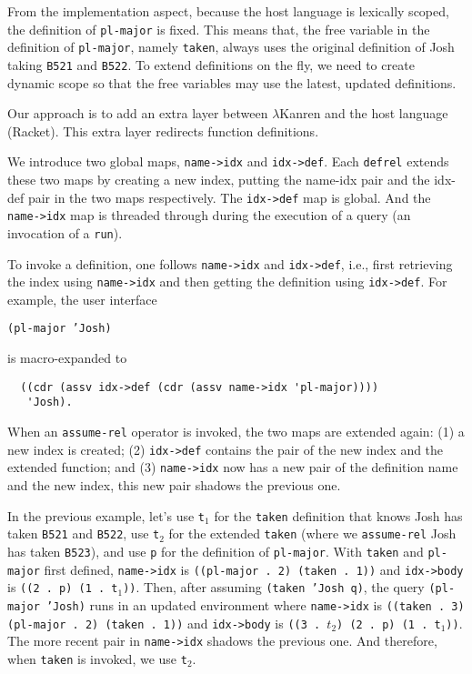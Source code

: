 \documentclass[acmlarge,review]{acmart}
\theoremstyle{definition}
\begin{document}
From the implementation aspect, because the host language is lexically scoped,
the definition of \texttt{pl-major} is fixed. This means that, the free variable
in the definition of \texttt{pl-major}, namely \texttt{taken}, always uses the
original definition of Josh taking \texttt{B521} and \texttt{B522}. 
To extend definitions on the fly, we need to create dynamic scope so that the
free variables may use the latest, updated definitions.

Our approach is to add an extra layer between $\lambda$Kanren and the host
language (Racket). This extra layer redirects function definitions.

We introduce two global maps,
\texttt{name->idx} and \texttt{idx->def}. Each \texttt{defrel} extends these
two maps by creating a new index, putting the name-idx pair and the
idx-def pair in the two maps respectively.
The \texttt{idx->def} map is global. And the \texttt{name->idx}
map is threaded through during the execution of
a query (an invocation of a \texttt{run}).

To invoke a definition, one follows \texttt{name->idx} and
\texttt{idx->def}, i.e., first retrieving the index using \texttt{name->idx}
and then getting the definition using \texttt{idx->def}.
For example, the user interface

{\centering
  \texttt{(pl-major 'Josh)}

}
\noindent is macro-expanded to

\begin{lstlisting}
  ((cdr (assv idx->def (cdr (assv name->idx 'pl-major))))
   'Josh).
\end{lstlisting}

When an \texttt{assume-rel} operator is invoked, the two maps are extended
again: (1) a new index is created; (2) \texttt{idx->def} contains the pair of
the new index and the extended function; and (3) \texttt{name->idx} now has
a new pair of the definition name and the new index, this new pair shadows the
previous one.

In the previous example, let's use \texttt{t$_1$} for the \texttt{taken}
definition that knows Josh has taken \texttt{B521} and \texttt{B522},
use \texttt{t$_2$} for the extended \texttt{taken}
(where we \texttt{assume-rel} Josh has taken \texttt{B523}), and use \texttt{p} for
the definition of \texttt{pl-major}.
With \texttt{taken} and \texttt{pl-major} first defined,
\texttt{name->idx} is \texttt{((pl-major . 2) (taken . 1))}
and \texttt{idx->body} is \mbox{\texttt{((2 . p) (1 . t$_1$))}}.
Then, after assuming \texttt{(taken 'Josh q)}, the query \texttt{(pl-major 'Josh)}
runs in an updated environment where 
\texttt{name->idx} is \texttt{((taken . 3) (pl-major . 2) (taken . 1))}
and \texttt{idx->body} is \mbox{\texttt{((3 . $t_2$) (2 . p) (1 . t$_1$))}}.
The more recent pair in \texttt{name->idx} shadows the previous one. And therefore,
when \texttt{taken} is invoked, we use \texttt{t$_2$}.
\end{document}
